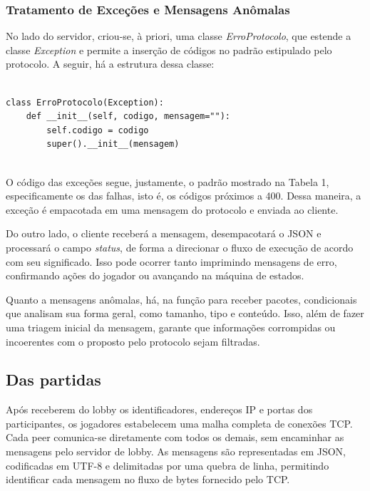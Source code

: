 \documentclass[11pt,a4paper]{article}
\begin{document}
\subsubsection{Tratamento de Exceções e Mensagens Anômalas}

No lado do servidor, criou-se, à priori, uma classe \textit{ErroProtocolo}, que estende a classe \textit{Exception} e permite a inserção de códigos no padrão estipulado pelo protocolo. A seguir, há a estrutura dessa classe:

\par\medskip
\noindent
\begin{minipage}{\linewidth}
\begin{verbatim}

class ErroProtocolo(Exception):
    def __init__(self, codigo, mensagem=""):
        self.codigo = codigo
        super().__init__(mensagem)
        
\end{verbatim}
\end{minipage}
\par\medskip

O código das exceções segue, justamente, o padrão mostrado na Tabela 1, especificamente os das falhas, isto é, os códigos próximos a 400. Dessa maneira, a exceção é empacotada em uma mensagem do protocolo e enviada ao cliente.

Do outro lado, o cliente receberá a mensagem, desempacotará o JSON e processará o campo \textit{status}, de forma a direcionar o fluxo de execução de acordo com seu significado. Isso pode ocorrer tanto imprimindo mensagens de erro, confirmando ações do jogador ou avançando na máquina de estados.

Quanto a mensagens anômalas, há, na função para receber pacotes, condicionais que analisam sua forma geral, como tamanho, tipo e conteúdo. Isso, além de fazer uma triagem inicial da mensagem, garante que informações corrompidas ou incoerentes com o proposto pelo protocolo sejam filtradas.

\subsection{Das partidas}

Após receberem do lobby os identificadores, endereços IP e portas dos participantes, os jogadores estabelecem uma malha completa de conexões TCP. Cada peer comunica-se diretamente com todos os demais, sem encaminhar as mensagens pelo servidor de lobby. As mensagens são representadas em JSON, codificadas em UTF-8 e delimitadas por uma quebra de linha, permitindo identificar cada mensagem no fluxo de bytes fornecido pelo TCP.
\end{document}
